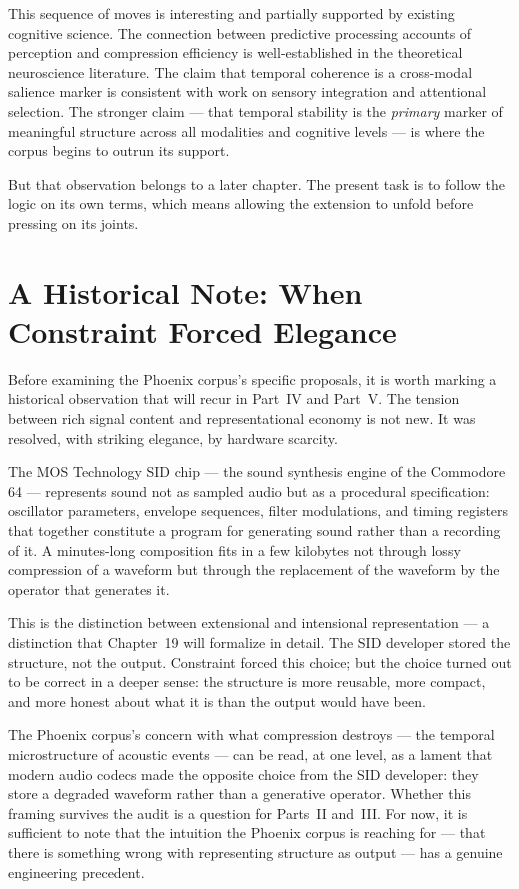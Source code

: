 This sequence of moves is interesting and partially supported by
existing cognitive science. The connection between predictive
processing accounts of perception and compression efficiency is
well-established in the theoretical neuroscience literature.
The claim that temporal coherence is a cross-modal salience marker
is consistent with work on sensory integration and attentional
selection. The stronger claim --- that temporal stability is the
\emph{primary} marker of meaningful structure across all modalities
and cognitive levels --- is where the corpus begins to outrun
its support.

But that observation belongs to a later chapter. The present task
is to follow the logic on its own terms, which means allowing the
extension to unfold before pressing on its joints.

\section{A Historical Note: When Constraint Forced Elegance}
\label{sec:historical-constraint}

Before examining the Phoenix corpus's specific proposals,
it is worth marking a historical observation that
will recur in Part~IV and Part~V. The tension between
rich signal content and representational economy is
not new. It was resolved, with striking elegance, by
hardware scarcity.

The MOS Technology SID chip --- the sound synthesis
engine of the Commodore 64 --- represents sound not
as sampled audio but as a procedural specification:
oscillator parameters, envelope sequences, filter
modulations, and timing registers that together constitute
a program for generating sound rather than a recording
of it. A minutes-long composition fits in a few kilobytes
not through lossy compression of a waveform but
through the replacement of the waveform by the
operator that generates it.

This is the distinction between extensional and
intensional representation --- a distinction that
Chapter~19 will formalize in detail. The SID developer
stored the structure, not the output. Constraint
forced this choice; but the choice turned out to be
correct in a deeper sense: the structure is more
reusable, more compact, and more honest about what
it is than the output would have been.

The Phoenix corpus's concern with what compression
destroys --- the temporal microstructure of acoustic
events --- can be read, at one level, as a lament
that modern audio codecs made the opposite choice
from the SID developer: they store a degraded waveform
rather than a generative operator. Whether this framing
survives the audit is a question for Parts~II and~III.
For now, it is sufficient to note that the intuition
the Phoenix corpus is reaching for --- that there is
something wrong with representing structure as output
--- has a genuine engineering precedent.


